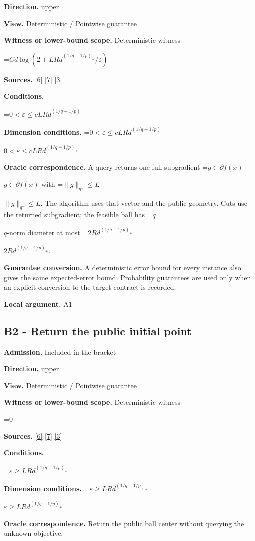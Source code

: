 \documentclass[10pt,a4paper]{article}
\newcommand{\AtlasMath}[1]{\par\begingroup\centering\setbox0=\hbox{$\displaystyle #1$}\ifdim\wd0>1.4\linewidth\typeout{ATLAS WIDE FORMULA: \the\wd0}\fi\ifdim\wd0>\linewidth\resizebox{\linewidth}{!}{\box0}\else\box0\fi\par\endgroup}
\newcommand{\AtlasInlineMath}[1]{\begingroup\setbox0=\hbox{$#1$}\ifdim\wd0>.4\linewidth\endgroup\AtlasMath{#1}\else\endgroup$#1$\fi}
\begin{document}
\textbf{Direction.} upper

\textbf{View.} Deterministic / Pointwise guarantee

\textbf{Witness or lower-bound scope.} Deterministic witness

\AtlasMath{C d\log(2+LRd^{(1/q-1/p)_+}/\varepsilon)}
\textbf{Sources.} \href{https://arxiv.org/pdf/1405.4980}{[6]} \href{https://www2.isye.gatech.edu/~nemirovs/MOR_AccuracyCertificates.pdf}{[7]} \href{https://arxiv.org/pdf/2609.20701}{[3]}

\textbf{Conditions.} 
\AtlasMath{0<\varepsilon\le c LRd^{(1/q-1/p)_+}}


\textbf{Dimension conditions.} \AtlasInlineMath{0<\varepsilon\le c LRd^{(1/q-1/p)_+}}

\textbf{Oracle correspondence.} A query returns one full subgradient \AtlasInlineMath{g\in\partial f(x)} with \AtlasInlineMath{\|g\|_{q^\star}\le L}. The algorithm uses that vector and the public geometry. Cuts use the returned subgradient; the feasible ball has \AtlasInlineMath{q}-norm diameter at most \AtlasInlineMath{2Rd^{(1/q-1/p)_+}}.

\textbf{Guarantee conversion.} A deterministic error bound for every instance also gives the same expected-error bound. Probability guarantees are used only when an explicit conversion to the target contract is recorded.

\textbf{Local argument.} A1

\subsection{B2 - Return the public initial point}
\textbf{Admission.} Included in the bracket

\textbf{Direction.} upper

\textbf{View.} Deterministic / Pointwise guarantee

\textbf{Witness or lower-bound scope.} Deterministic witness

\AtlasMath{0}
\textbf{Sources.} \href{https://arxiv.org/pdf/1405.4980}{[6]} \href{https://www2.isye.gatech.edu/~nemirovs/MOR_AccuracyCertificates.pdf}{[7]} \href{https://arxiv.org/pdf/2609.20701}{[3]}

\textbf{Conditions.} 
\AtlasMath{\varepsilon\ge LRd^{(1/q-1/p)_+}}


\textbf{Dimension conditions.} \AtlasInlineMath{\varepsilon\ge LRd^{(1/q-1/p)_+}}

\textbf{Oracle correspondence.} Return the public ball center without querying the unknown objective.
\end{document}
